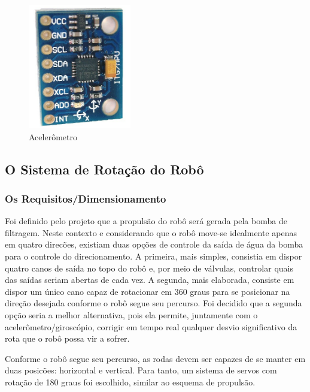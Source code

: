 \begin{description}
\par
\begin{figure}[h]
  \centering
  \includegraphics[width=0.4\textwidth]{figures/accelerometer.png}
  \caption{Acelerômetro}
  \label{fig:gpi}
\end{figure}
\FloatBarrier
\par
\end{description}

\subsection{O Sistema de Rotação do Robô}
\subsubsection{Os Requisitos/Dimensionamento}
Foi definido pelo projeto que a propulsão do robô será gerada pela bomba de filtragem. Neste contexto e considerando que o robô move-se idealmente apenas em quatro direcões, existiam duas opções de controle da saída de água da bomba para o controle do direcionamento. A primeira, mais simples, consistia em dispor quatro canos de saída no topo do robô e, por meio de válvulas, controlar quais das saídas seriam abertas de cada vez. A segunda, mais elaborada, consiste em dispor um único cano capaz de rotacionar em 360 graus para se posicionar na direção desejada conforme o robô segue seu percurso. Foi decidido que a segunda opção seria a melhor alternativa, pois ela permite, juntamente com o acelerômetro/giroscópio, corrigir em tempo real qualquer desvio significativo da rota que o robô possa vir a sofrer.

	Conforme o robô segue seu percurso, as rodas devem ser capazes de se manter em duas posicões: horizontal e vertical. Para tanto, um sistema de servos com rotação de 180 graus foi escolhido, similar ao esquema de propulsão.

